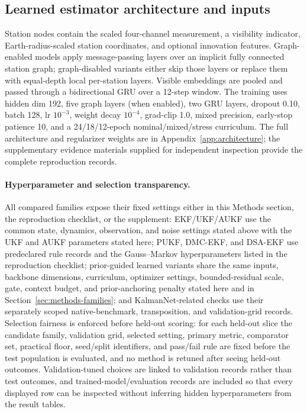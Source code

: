 \documentclass{article}
\begin{document}
\subsection{Learned estimator architecture and inputs}
Station nodes contain the scaled four-channel measurement, a visibility indicator, Earth-radius-scaled station coordinates, and optional innovation features. Graph-enabled models apply message-passing layers over an implicit fully connected station graph; graph-disabled variants either skip those layers or replace them with equal-depth local per-station layers. Visible embeddings are pooled and passed through a bidirectional GRU over a 12-step window. The training uses hidden dim 192, five graph layers (when enabled), two GRU layers, dropout 0.10, batch 128, lr $10^{-3}$, weight decay $10^{-4}$, grad-clip 1.0, mixed precision, early-stop patience 10, and a 24/18/12-epoch nominal/mixed/stress curriculum. The full architecture and regularizer weights are in Appendix~\ref{app:architecture}; the supplementary evidence materials supplied for independent inspection provide the complete reproduction records.

\paragraph{Hyperparameter and selection transparency.}
All compared families expose their fixed settings either in this Methods section, the reproduction checklist, or the supplement: EKF/UKF/AUKF use the common state, dynamics, observation, and noise settings stated above with the UKF and AUKF parameters stated here; PUKF, DMC-EKF, and DSA-EKF use predeclared rule records and the Gauss--Markov hyperparameters listed in the reproduction checklist; prior-guided learned variants share the same inputs, backbone dimensions, curriculum, optimizer settings, bounded-residual scale, gate, context budget, and prior-anchoring penalty stated here and in Section~\ref{sec:methods-families}; and KalmanNet-related checks use their separately scoped native-benchmark, transposition, and validation-grid records. Selection fairness is enforced before held-out scoring: for each held-out slice the candidate family, validation grid, selected setting, primary metric, comparator set, practical floor, seed/split identifiers, and pass/fail rule are fixed before the test population is evaluated, and no method is retuned after seeing held-out outcomes. Validation-tuned choices are linked to validation records rather than test outcomes, and trained-model/evaluation records are included so that every displayed row can be inspected without inferring hidden hyperparameters from the result tables.
\end{document}
